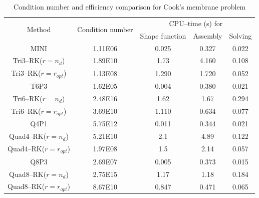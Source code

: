 \begin{table}[H]
\centering
\caption{Condition number and efficiency comparison for Cook's membrane problem}
\label{tab_condition}
\begin{tabular}{ccccc}
\toprule
\multirow{2}{*}{Method} & \multirow{2}{*}{Condition number} & \multicolumn{3}{c}{CPU--time (s) for} \\
\shortstack{} & \shortstack{} & Shape function & Assembly & Solving \\
\midrule
MINI & 1.11E06 & 0.025 & 0.327 & 0.022 \\
Tri3--RK($r=n_d$) & 1.89E10 & 1.73 & 4.160 & 0.108 \\
Tri3--RK($r=r_{opt}$) & 1.13E08 & 1.290 & 1.720 & 0.052 \\
T6P3 & 1.62E05 & 0.004 & 0.380 & 0.021 \\
Tri6--RK($r=n_d$) & 2.48E16 & 1.62 & 1.67 & 0.294 \\
Tri6--RK($r=r_{opt}$) & 3.69E10 & 1.110 & 0.634 & 0.077 \\
Q4P1 & 5.75E12 & 0.011 & 0.344 & 0.021 \\
Quad4--RK($r=n_d$) & 5.21E10 & 2.1 & 4.89 & 0.122 \\
Quad4--RK($r=r_{opt}$) & 1.97E08 & 1.5 & 2.14 & 0.057 \\
Q8P3 & 2.69E07 & 0.005 & 0.373 & 0.015 \\
Quad8--RK($r=n_d$) & 2.75E15 & 1.17 & 1.18 & 0.184 \\
Quad8--RK($r=r_{opt}$) & 8.67E10 & 0.847 & 0.471 & 0.065 \\
\bottomrule
\end{tabular}
\end{table}
